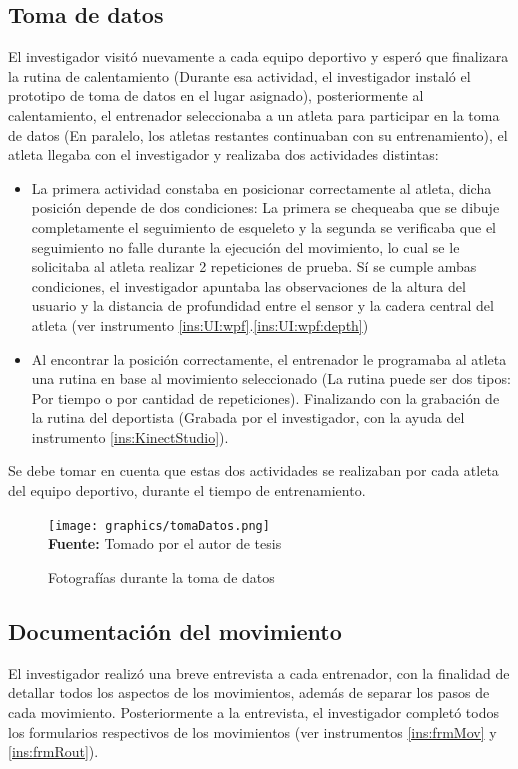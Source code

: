 \subsection{Toma de datos}
El investigador visit\'o nuevamente a cada equipo deportivo y esper\'o que finalizara la rutina de calentamiento (Durante esa actividad, el investigador instal\'o el prototipo de toma de datos en el lugar asignado), posteriormente al calentamiento, el entrenador seleccionaba a un atleta para participar en la toma de datos (En paralelo, los atletas restantes continuaban con su entrenamiento), el atleta llegaba con el investigador y realizaba dos actividades distintas:
\begin{itemize}
\item La primera actividad constaba en posicionar correctamente al atleta, dicha posici\'on depende de dos condiciones: La primera se chequeaba que se dibuje completamente el seguimiento de esqueleto y la segunda se verificaba que el seguimiento no falle durante la ejecuci\'on del movimiento, lo cual se le solicitaba al atleta realizar 2 repeticiones de prueba. S\'i se cumple ambas condiciones, el investigador apuntaba las observaciones de la altura del usuario y la distancia de profundidad entre el sensor y la cadera central del atleta (ver instrumento \ref{ins:UI:wpf}.\ref{ins:UI:wpf:depth})
\item Al encontrar la posici\'on correctamente, el entrenador le programaba al atleta una rutina en base al movimiento seleccionado (La rutina puede ser dos tipos: Por tiempo o por cantidad de repeticiones). Finalizando con la grabaci\'on de la rutina del deportista (Grabada por el investigador, con la ayuda del instrumento \ref{ins:KinectStudio}).
\end{itemize}
Se debe tomar en cuenta que estas dos actividades se realizaban por cada atleta del equipo deportivo, durante el tiempo de entrenamiento.
 \begin{figure}[H]
	\caption{Fotograf\'ias durante la toma de datos}
	\label{fig:getDataStep}
	\centering
	\texttt{[image: graphics/tomaDatos.png]} \\
	\textbf{Fuente:} Tomado por el autor de tesis
\end{figure} 
\subsection{Documentaci\'on del movimiento}
El investigador realiz\'o una breve entrevista a cada entrenador, con la finalidad de detallar todos los aspectos de los movimientos, adem\'as de separar los pasos de cada movimiento. Posteriormente a la entrevista, el investigador complet\'o todos los formularios respectivos de los movimientos (ver instrumentos \ref{ins:frmMov} y \ref{ins:frmRout}).
